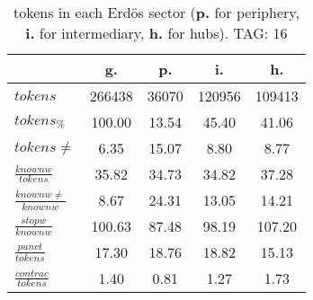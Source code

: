 \begin{table}[h!]
\begin{center}
\begin{tabular}{| l | c | c | c | c |}\hline
 & g. & p. & i. & h. \\\hline
$tokens$ & 266438  & 36070  & 120956  & 109413 \\\hline
$tokens_{\%}$ & 100.00  & 13.54  & 45.40  & 41.06 \\\hline
$tokens \neq$ & 6.35  & 15.07  & 8.80  & 8.77 \\\hline
$\frac{knownw}{tokens}$ & 35.82  & 34.73  & 34.82  & 37.28 \\\hline
$\frac{knownw \neq}{knownw}$ & 8.67  & 24.31  & 13.05  & 14.21 \\\hline
$\frac{stopw}{knownw}$ & 100.63  & 87.48  & 98.19  & 107.20 \\\hline
$\frac{punct}{tokens}$ & 17.30  & 18.76  & 18.82  & 15.13 \\\hline
$\frac{contrac}{tokens}$ & 1.40  & 0.81  & 1.27  & 1.73 \\\hline
\end{tabular}
\caption{tokens in each Erd\"os sector ({{\bf p.}} for periphery, {{\bf i.}} for intermediary, 
    {{\bf h.}} for hubs). TAG: 16}
\end{center}
\end{table}